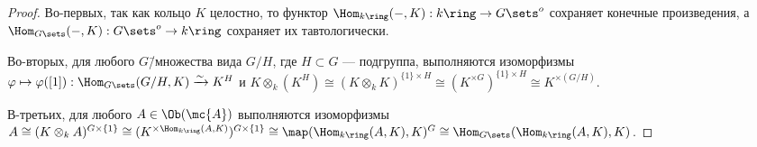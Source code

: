 \documentclass[
	extrafontsizes,
	11pt,
	hyphens,
]{memoir}
\begin{document}
\begin{proof}

Во-первых,
так как кольцо \(K\) целостно,
то функтор
\(\Hom_{k\ring}(-, K) : k\ring \to G\sets^o\)
сохраняет конечные произведения, а
\(\Hom_{G\sets}(-, K) : G\sets^o \to k\ring\)
сохраняет их тавтологически.

Во-вторых, для любого \(G\)\=/множества вида \(G/H\), где \(H \subset G\) --- подгруппа, выполняются изоморфизмы
\(\varphi \mapsto \varphi([1]) : \Hom_{G\sets}(G/H, K) \xrightarrow{\sim} K^H\)
и
\(K \otimes_k (K^H) \cong (K \otimes_k K)^{\{1\} \times H} \cong (K^{\times G})^{\{1\} \times H} \cong K^{\times (G/H)}\).

В-третьих, для любого \(A \in \Ob(\mc{A})\) выполняются изоморфизмы
\(A \cong (K \otimes_k A)^{G \times \{1\}} \cong (K^{\times \Hom_{k\ring}(A, K)})^{G \times \{1\}} \cong \map(\Hom_{k\ring}(A, K), K)^G \cong \Hom_{G\sets}(\Hom_{k\ring}(A, K), K)\).
\end{proof}

%
%
%
\end{document}
